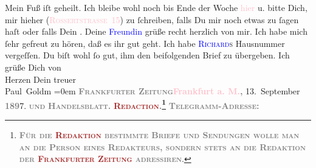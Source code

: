            \pstart
           Mein Fuß iſt geheilt. Ich bleibe wohl noch bis Ende der Woche \textcolor{pink}{hier}{} u. bitte Dich, mir hieher  (\textsc{\textcolor{pink}{Rossertstraſse 15}{}\ledrightnote{\textcolor{pink}{Rossertstraße}}}) zu ſchreiben, falls Du mir noch etwas zu ſagen haſt oder falls Dein \label{K_L02823-11v}\label{K_L02823-11h}.\pend
           \pstart
           Deine \textcolor{blue}{Freundin}{} grüße recht
               herzlich von mir. Ich habe mich ſehr gefreut zu hören, daß es ihr gut geht.\pend
           \pstart
           Ich habe \textsc{\textcolor{blue}{Richard}{}\ledrightnote{\textcolor{blue}{Richard Beer-Hofmann}}s}{ }{\pb}Hausnummer vergeſſen. Du biſt wohl ſo gut, ihm den
               beifolgenden Brief zu übergeben.\pend
           \pstart
           Ich grüße Dich von {\\[\baselineskip]}Herzen Dein treuer {\\[\baselineskip]}\spacefill\mbox{Paul Goldm}\pend
           \leftskip=0em{}{\bigskip}\pstart
           \noindent{}{\pb}\textcolor{brown}{\textcolor{gray}{\textbf{\textsc{Frankfurter Zeitung}}}}{}\ledrightnote{\textcolor{brown}{Frankfurter Zeitung}}\hfill \textcolor{gray}{\textbf{\textcolor{pink}{Frankfurt a. M.}{}\ledrightnote{\textcolor{pink}{Frankfurt am Main}},}}{ }13. September \textcolor{gray}{\textbf{189}}7.\pend
           \pstart
           \textsc{\textcolor{gray}{\textbf{und}}}\pend
           \pstart
           \textcolor{gray}{\textbf{\textsc{Handelsblatt.}}}\pend
           \pstart
           \textcolor{gray}{\textbf{\textsc{\textcolor{brown}{Redaction}{}.\footnote{\noindent{}\textcolor{gray}{\textbf{\textsc{Für die \textcolor{brown}{Redaktion} bestimmte Briefe und Sendungen
                                    wolle man  an die Person eines
                                    Redakteurs, sondern stets \textbf{an die Redaktion der
                                          \textcolor{brown}{Frankfurter Zeitung}} adressiren}}}.}}}}\pend
           \pstart
           \textcolor{gray}{\textbf{\textsc{Telegramm-Adresse:}}}\pend
